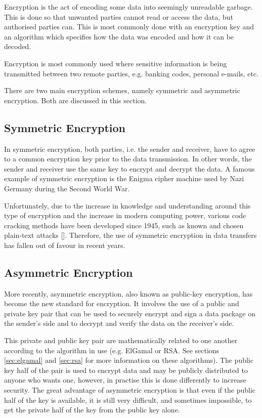 Encryption is the act of encoding some data into seemingly unreadable garbage. This is done so
that unwanted parties cannot read or access the data, but authorised parties can. This
is most commonly done with an encryption key and an algorithm which specifies how the data
was encoded and how it can be decoded.

Encryption is most commonly used where sensitive information is being transmitted between
two remote parties, e.g. banking codes, personal e-mails, etc.

There are two main encryption schemes, namely symmetric and asymmetric encryption. Both
are discussed in this section.

\subsection{Symmetric Encryption}

In symmetric encryption, both parties, i.e. the sender and receiver, have to agree to a common
encryption key prior to the data transmission. In other words, the sender and receiver use the
same key to encrypt and decrypt the data. A famous example of symmetric encryption is the
Enigma cipher machine used by Nazi Germany during the Second World War. 

Unfortunately, due to the increase in knowledge and understanding around this type of
encryption and the increase in modern computing power, various code cracking methods have been
developed since 1945, such as known and chosen plain-text attacks
[\cite{journal:cypher-attacks}]. Therefore, the use of symmetric encryption in data
transfers has fallen out of favour in recent years.

\subsection{Asymmetric Encryption}
\label{sec:assymetric-encryption}

More recently, asymmetric encryption, also known as public-key encryption, has become the new
standard for encryption. It involves the use of a public and private key pair that can be used
to securely encrypt and sign a data package on the sender's side and to decrypt and verify the
data on the receiver's side.

This private and public key pair are mathematically related to one another according to the
algorithm in use (e.g. ElGamal or RSA. See sections \ref{sec:elgamal} and \ref{sec:rsa}
for more information on these algorithms).
The public key half of the pair is used to encrypt data and may be publicly distributed to anyone
who wants one, however, in practise this is done differently to increase security. The
great advantage of asymmetric encryption is that even if the public half of the
key is available, it is still very difficult, and sometimes impossible, to get
the private half of the key from the public key alone. 

